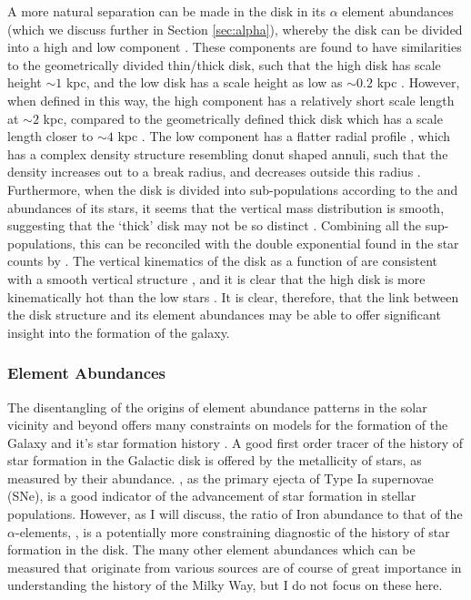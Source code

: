 A more natural separation can be made in the disk in its $\alpha$ element abundances (which we discuss further in Section \ref{sec:alpha}), whereby the disk can be divided into a high and low \afe{} component \citep[e.g.][]{1998A&A...338..161F,2003A&A...410..527B,2005A&A...433..185B,2013A&A...560A.109H,2014A&A...562A..71B,2014A&A...564A.115A,2014ApJ...796...38N,2015ApJ...808..132H}. These components are found to have similarities to the geometrically divided thin/thick disk, such that the high \afe{} disk has scale height $\sim 1$ kpc, and the low \afe{} disk has a scale height as low as $\sim 0.2$ kpc \citep[e.g.][]{2012ApJ...753..148B,2016ApJ...823...30B}. However, when defined in this way, the high \afe{} component has a relatively short scale length at $\sim 2$ kpc, compared to the geometrically defined thick disk which has a scale length closer to $\sim4$ kpc \citep{2008ApJ...673..864J}. The low \afe{} component has a flatter radial profile \citep{2012ApJ...752...51C}, which has a complex density structure resembling donut shaped annuli, such that the density increases out to a break radius, and decreases outside this radius \citep{2012ApJ...753..148B,2016ApJ...823...30B}. Furthermore, when the disk is divided into sub-populations according to the \afe{} and \feh{} abundances of its stars, it seems that the vertical mass distribution is smooth, suggesting that the `thick' disk may not be so distinct \citep{2012ApJ...751..131B}. Combining all the sup-populations, this can be reconciled with the double exponential found in the star counts by \citet{1983MNRAS.202.1025G} \citep[see][]{2013A&ARv..21...61R}. The vertical kinematics of the disk as a function of \afe{} are consistent with a smooth vertical structure \citep{2012ApJ...755..115B}, and it is clear that the high \afe{} disk is more kinematically hot than the low \afe{} stars \citep[e.g.][]{2005A&A...433..185B}. It is clear, therefore, that the link between the disk structure and its element abundances may be able to offer significant insight into the formation of the galaxy.

\subsubsection{Element Abundances}

The disentangling of the origins of element abundance patterns in the solar vicinity and beyond offers many constraints on models for the formation of the Galaxy and it's star formation history \citep[a seminal review on the goals of this effort is given by][]{2002ARA&A..40..487F}. A good first order tracer of the history of star formation in the Galactic disk is offered by the metallicity of stars, as measured by their \feh{} abundance. \feh{}, as the primary ejecta of Type Ia supernovae (SNe), is a good indicator of the advancement of star formation in stellar populations. However, as I will discuss, the ratio of Iron abundance to that of the $\alpha$-elements, \afe{}, is a potentially more constraining diagnostic of the history of star formation in the disk. The many other element abundances which can be measured that originate from various sources are of course of great importance in understanding the history of the Milky Way, but I do not focus on these here.

